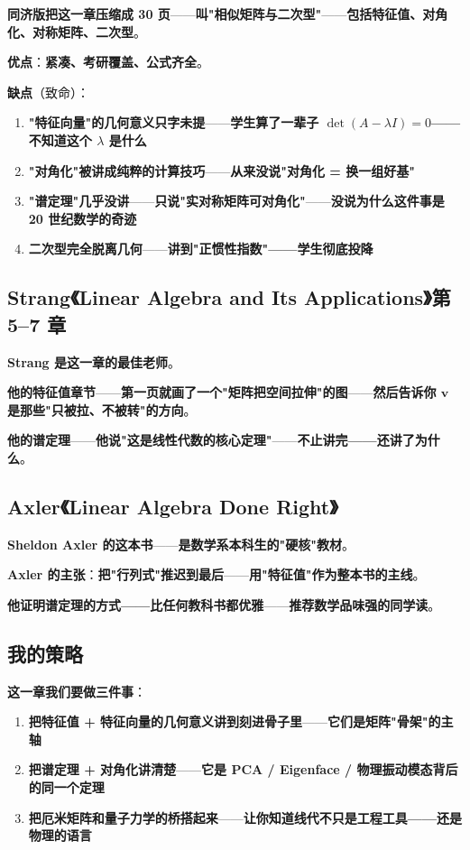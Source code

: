\textbf{同济版把这一章压缩成 30 页}——\textbf{叫"相似矩阵与二次型"}——\textbf{包括特征值、对角化、对称矩阵、二次型}。

\textbf{优点}：\textbf{紧凑、考研覆盖、公式齐全}。

\textbf{缺点}（致命）：

\begin{enumerate}
\item \textbf{"特征向量"的几何意义只字未提}——\textbf{学生算了一辈子 $\det(A - \lambda I) = 0$——不知道这个 $\lambda$ 是什么}
\item \textbf{"对角化"被讲成纯粹的计算技巧}——\textbf{从来没说"对角化 = 换一组好基"}
\item \textbf{"谱定理"几乎没讲}——\textbf{只说"实对称矩阵可对角化"}——\textbf{没说为什么这件事是 20 世纪数学的奇迹}
\item \textbf{二次型完全脱离几何}——\textbf{讲到"正惯性指数"——学生彻底投降}
\end{enumerate}

\subsection{Strang《Linear Algebra and Its Applications》第 5--7 章}

\textbf{Strang 是这一章的最佳老师}。

\textbf{他的特征值章节}——\textbf{第一页就画了一个"矩阵把空间拉伸"的图}——\textbf{然后告诉你 $\bm{v}$ 是那些"只被拉、不被转"的方向}。

\textbf{他的谱定理}——\textbf{他说"这是线性代数的核心定理"}——\textbf{不止讲完——还讲了为什么}。

\subsection{Axler《Linear Algebra Done Right》}

\textbf{Sheldon Axler 的这本书}——\textbf{是数学系本科生的"硬核"教材}。

\textbf{Axler 的主张}：\textbf{把"行列式"推迟到最后}——\textbf{用"特征值"作为整本书的主线}。

\textbf{他证明谱定理的方式——比任何教科书都优雅}——\textbf{推荐数学品味强的同学读}。

\subsection{我的策略}

\textbf{这一章我们要做三件事}：

\begin{enumerate}
\item \textbf{把特征值 + 特征向量的几何意义讲到刻进骨子里}——\textbf{它们是矩阵"骨架"的主轴}
\item \textbf{把谱定理 + 对角化讲清楚}——\textbf{它是 PCA / Eigenface / 物理振动模态背后的同一个定理}
\item \textbf{把厄米矩阵和量子力学的桥搭起来}——\textbf{让你知道线代不只是工程工具——还是物理的语言}
\end{enumerate}

